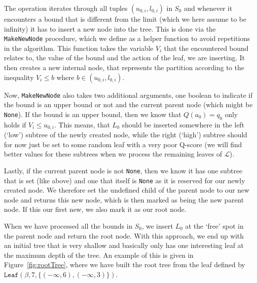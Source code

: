 \documentclass{article}
\begin{document}
\begin{algorithm}[ht]
\begin{algorithmic}[1]
        \EndFor%

        \Else%
        \EndIf%
        \EndFunction%
    \end{algorithmic}

\end{algorithm}

The operation iterates through all tuples $(u_{0,i},l_{0,i})$ in $S_0$ and
whenever it encounters a bound that is different from the limit (which we here
assume to be infinity) it has to insert a new node into the tree. This is done
via the \texttt{MakeNewNode} procedure, which we define as a helper function to
avoid repetitions in the algorithm. This function takes the variable $V_i$ that
the encountered bound relates to, the value of the bound and the action of the
leaf, we are inserting. It then creates a new internal node, that represents
the partition according to the inequality $V_i \leq b$ where $b \in (u_{0,i},
l_{0,i})$.

Now, \texttt{MakeNewNode} also takes two additional arguments, one boolean to
indicate if the bound is an upper bound or not and the current parent node
(which might be \texttt{None}). If the bound is an upper bound, then we know
that $Q(a_0) = q_0$ only holds if $V_i \leq u_{0,i}$. This means, that $L_0$
should be inserted somewhere in the left (`low') subtree of the newly created
node, while the right (`high') subtree should for now just be set to some
random leaf with a very poor Q-score (we will find better values for these
subtrees when we process the remaining leaves of $\mathcal{L}$).

Lastly, if the current parent node is not \texttt{None}, then we know it has one
subtree that is set (like above) and one that itself is \texttt{None} as it is
reserved for our newly created node. We therefore set the undefined child of the
parent node to our new node and returns this new node, which is then marked as
being the new parent node. If this our first new, we also mark it as our root
node.

When we have processed all the bounds in $S_0$, we insert $L_0$ at the `free'
spot in the parent node and return the root node. With this approach, we end up
with an initial tree that is very shallow and basically only has one interesting
leaf at the maximum depth of the tree. An example of this is given in
Figure~\ref{fig:rootTree}, where we have built the root tree from the leaf
defined by $\texttt{Leaf}(\beta, 7, \{ (-\infty, 6), (-\infty, 3) \})$.
\end{document}
